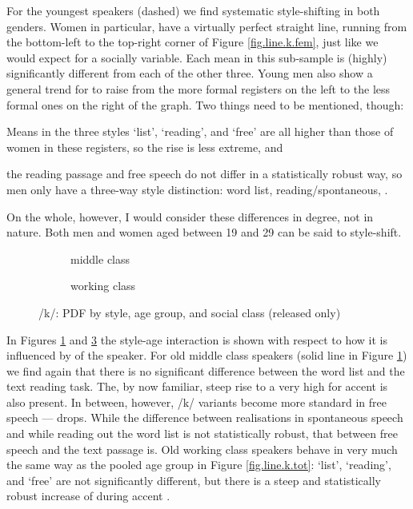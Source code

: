 For the youngest speakers (dashed) we find systematic style-shifting in both genders.
Women in particular, have a virtually perfect straight line, running from the bottom-left to the top-right corner of Figure \ref{fig.line.k.fem}, just like we would expect for a socially  variable.
Each mean in this sub-sample is (highly) significantly different from each of the other three.
Young men also show a general trend for  to raise from the more formal registers on the left to the less formal ones on the right of the graph.
Two things need to be mentioned, though:
\begin{inparaenum}[(1)]
	\item Means in the three styles `list', `reading', and `free' are all higher than those of women in these registers, so the rise is less extreme, and
	\item the reading passage and free speech do not differ in a statistically robust way, so men only have a three-way style distinction: word list, reading/spontaneous, .
\end{inparaenum}
On the whole, however, I would consider these differences in degree, not in nature.
Both men and women aged between 19 and 29 can be said to style-shift.

\begin{figure}[h]
	\centering
	\begin{subfigure}{.49\textwidth}
		\centering
			\resizebox{\linewidth}{!}{} 
		\caption{middle class}
		\label{fig.line.k.mc}
	\end{subfigure}
	\begin{subfigure}{.49\textwidth}
		\centering
			\resizebox{\linewidth}{!}{} 
		\caption{working class}
		\label{fig.line.k.wc}
	\end{subfigure}
	\caption{/k/: PDF by style, age group, and social class (released only)}
\end{figure}

In Figures \ref{fig.line.k.mc} and \ref{fig.line.k.wc} the style-age interaction is shown with respect to how it is influenced by  of the speaker.
For old middle class speakers (solid line in Figure \ref{fig.line.k.mc}) we find again that there is no significant difference between the word list and the text reading task.
The, by now familiar, steep rise to a very high  for accent  is also present.
In between, however, /k/ variants become more standard in free speech ---  drops.
While the difference between realisations in spontaneous speech and while reading out the word list is not statistically robust, that between free speech and the text passage is.
Old working class speakers behave in very much the same way as the pooled age group in Figure \ref{fig.line.k.tot}: `list', `reading', and `free' are not significantly different, but there is a steep and statistically robust increase of  during accent .

